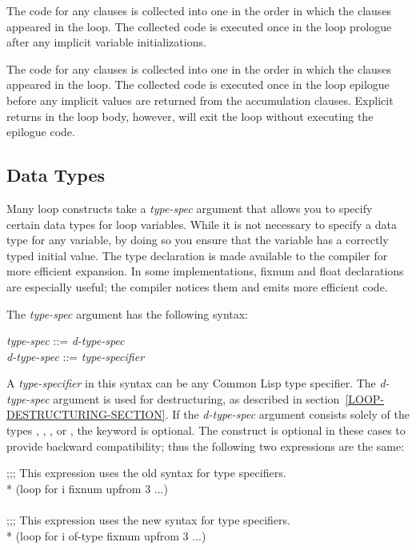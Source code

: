 \begin{new}
  The code for any  clauses is collected
  into one  in the order in which the clauses appeared in
  the loop.  The collected code is executed once in the loop prologue
  after any implicit variable initializations.

  The code for any  clauses is collected 
  into one  in the order in which the clauses appeared in
  the loop.  The collected code is executed once in the loop epilogue
  before any implicit values are returned from the accumulation clauses.
  Explicit returns in the loop body, however, will exit the loop
  without executing the epilogue code.

\subsection{Data Types}
\label{LOOP-TYPES-SECTION}

Many loop constructs take a {\it type-spec\/} argument that
allows you to specify  certain data types for loop variables.
While it is not necessary to specify a data type for any variable,
by doing so you ensure that the variable has a correctly typed initial
value.  The type declaration is made available to the compiler for
more efficient  
expansion. 
In some implementations,
fixnum and float declarations are especially
useful; the compiler notices them and emits more efficient code.  



The {\it type-spec\/} argument has the following syntax:
\begin{tabbing}
{\it type-spec\/} ::=  {\it d-type-spec} \\
{\it d-type-spec\/} ::= {\it type-specifier\/} {\Mor} 
\end{tabbing}
A {\it type-specifier} in this syntax can be any Common Lisp type
specifier.  The {\it d-type-spec} argument is used for destructuring,
as described in section~\ref{LOOP-DESTRUCTURING-SECTION}.  If the
{\it d-type-spec} argument consists solely of the types ,
, , or \nil, the  keyword is optional.  The
 construct is optional in these cases to provide backward
compatibility; thus the following two expressions are the same:

\begin{lisp}
;;; This expression uses the old syntax for type specifiers. \\*
(loop for i fixnum upfrom 3 ...) \\
 \\
;;; This expression uses the new syntax for type specifiers. \\*
(loop for i of-type fixnum upfrom 3 ...)
\end{lisp}


\end{new}
